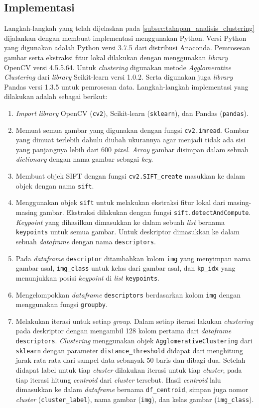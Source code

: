 \subsection{Implementasi}
\label{subsec:tahapan_implementasi_analisis_clustering}
Langkah-langkah yang telah dijelaskan pada \ref{subsec:tahapan_analisis_clustering} dijalankan dengan membuat implementasi menggunakan Python. Versi Python yang digunakan adalah Python versi 3.7.5 dari distribusi Anaconda. Pemrosesan gambar serta ekstraksi fitur lokal dilakukan dengan menggunakan \textit{library} OpenCV versi 4.5.5.64. Untuk \textit{clustering} digunakan metode \textit{Agglomerative Clustering} dari \textit{library} Scikit-learn versi 1.0.2. Serta digunakan juga \textit{library} Pandas versi 1.3.5 untuk pemrosesan data. Langkah-langkah implementasi yang dilakukan adalah sebagai berikut:
\begin{enumerate}
	\item \textit{Import library} OpenCV (\texttt{cv2}), Scikit-learn (\texttt{sklearn}), dan Pandas (\texttt{pandas}).
	\item Memuat semua gambar yang digunakan dengan fungsi \texttt{cv2.imread}. Gambar yang dimuat terlebih dahulu diubah ukurannya agar menjadi tidak ada sisi yang panjangnya lebih dari 600 \textit{pixel}. \textit{Array} gambar disimpan dalam sebuah \textit{dictionary} dengan nama gambar sebagai \textit{key}.
	\item Membuat objek SIFT dengan fungsi \texttt{cv2.SIFT\_create} masukkan ke dalam objek dengan nama \texttt{sift}.
	\item Menggunakan objek \texttt{sift} untuk melakukan ekstraksi fitur lokal dari masing-masing gambar. Ekstraksi dilakukan dengan fungsi \texttt{sift.detectAndCompute}. \textit{Keypoint} yang dihasilkan dimasukkan ke dalam sebuah \textit{list} bernama \texttt{keypoints} untuk semua gambar. Untuk deskriptor dimasukkan ke dalam sebuah \textit{dataframe} dengan nama \texttt{descriptors}.
	\item Pada \textit{dataframe} \texttt{descriptor} ditambahkan kolom \texttt{img} yang menyimpan nama gambar asal, \texttt{img\_class} untuk kelas dari gambar asal, dan \texttt{kp\_idx} yang menunjukkan posisi \textit{keypoint} di \textit{list} \texttt{keypoints}.
	\item Mengelompokkan \textit{dataframe} \texttt{descriptors} berdasarkan kolom \texttt{img} dengan menggunakan fungsi \texttt{groupby}.
	\item Melakukan iterasi untuk setiap \textit{group}. Dalam setiap iterasi lakukan \textit{clustering} pada deskriptor dengan mengambil 128 kolom pertama dari \textit{dataframe} \texttt{descriptors}. \textit{Clustering} menggunakan objek \texttt{AgglomerativeClustering} dari \texttt{sklearn} dengan parameter \texttt{distance\_threshold} didapat dari menghitung jarak rata-rata dari sampel data sebanyak 50 baris dan dibagi dua. Setelah didapat label untuk tiap \textit{cluster} dilakukan iterasi untuk tiap \textit{cluster}, pada tiap iterasi hitung \textit{centroid} dari \textit{cluster} tersebut. Hasil \textit{centroid} lalu dimasukkan ke dalam \textit{dataframe} bernama \texttt{df\_centroid}, simpan juga nomor \textit{cluster} (\texttt{cluster\_label}), nama gambar (\texttt{img}), dan kelas gambar (\texttt{img\_class}).

\end{enumerate}
